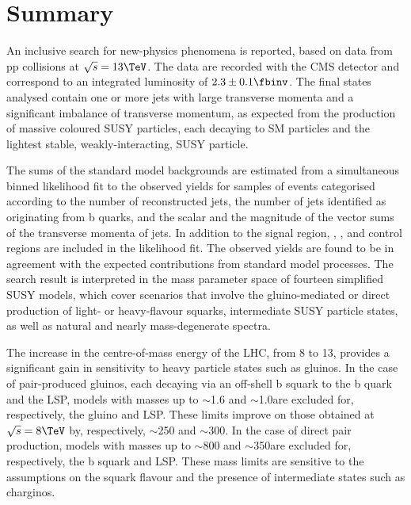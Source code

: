 
























\section{Summary}
\label{sec:summary}

An inclusive search for new-physics phenomena is reported, based on
data from pp collisions at $\sqrt{s} = 13\TeV$. The data are recorded
with the CMS detector and correspond to an integrated luminosity of
$2.3 \pm 0.1 \fbinv$. The final states analysed contain one or more
jets with large transverse momenta and a significant imbalance of
transverse momentum, as expected from the production of massive
coloured SUSY particles, each decaying to SM particles and the
lightest stable, weakly-interacting, SUSY particle.


The sums of the standard model backgrounds are estimated from a
simultaneous binned likelihood fit to the observed yields for samples
of events categorised according to the number of reconstructed jets,
the number of jets identified as originating from b quarks, and the
scalar and the magnitude of the vector sums of the transverse momenta
of jets. In addition to the signal region, \mj, \mmj, and \gj control
regions are included in the likelihood fit. The observed yields are
found to be in agreement with the expected contributions from standard
model processes.  The search result is interpreted in the mass
parameter space of fourteen simplified SUSY models,
which cover scenarios that involve the gluino-mediated or direct
production of light- or heavy-flavour squarks, intermediate SUSY
particle states, as well as natural and nearly mass-degenerate
spectra.

The increase in the centre-of-mass energy of the LHC, from 8 to
13\TeV, provides a significant gain in sensitivity to heavy particle
states such as gluinos. In the case of pair-produced gluinos, each
decaying via an off-shell b squark to the b quark and the LSP, models
with masses up to $\sim$1.6 and $\sim$1.0\TeV are excluded for,
respectively, the gluino and LSP. These limits improve on those
obtained at $\sqrt{s} = 8\TeV$ by, respectively, $\sim$250 and
$\sim$300\GeV. In the case of direct pair production, models with
masses up to $\sim$800 and $\sim$350\GeV are excluded for,
respectively, the b squark and LSP. These mass limits are sensitive to
the assumptions on the squark flavour and the presence of intermediate
states such as charginos.

